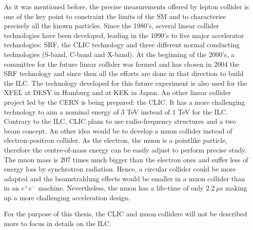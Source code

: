     As it was mentioned before, the precise measurements offered by lepton collider is one of the key point to constraint the limits of the \gls{SM} and to characterise precisely all the known particles.
    Since the 1980's, several linear collider technologies have been developed, leading in the 1990's to five major accelerator technologies: \gls{SRF}, the \gls{CLIC} technology and three different normal conducting technologies (S-band, C-band and X-band)\cite{Desy1988}.
    At the beginning of the 2000's, a committee for the future linear collider was formed and has chosen in 2004 the \gls{SRF} technology\cite{ICFA2004} and since then all the efforts are done in that direction to build the \gls{ILC}.
    The technology developed for this future experiment is also used for the XFEL at DESY in Hamburg and at KEK in Japan.
    An other linear collider project led by the CERN is being prepared: the \gls{CLIC}.
    It has a more challenging technology to aim a nominal energy of 3 TeV instead of 1 TeV for the \gls{ILC}.
    Contrary to the \gls{ILC}, \gls{CLIC} plans to use radio-frequency structures and a two beam concept. 
    An other idea would be to develop a muon collider instead of electron-positron collider\cite{Lipton2012}.
    As the electron, the muon is a pointlike particle, therefore the centre-of-mass energy can be easily adjust to perform precise study.
    The muon mass is 207 times much bigger than the electron ones and suffer less of energy loss by synchrotron radiation.
    Hence, a circular collider could be more adapted and the beamstrahlung effects would be smaller in a muon collider than in an $e^+e^-$ machine.
    Nevertheless, the muon has a life-time of only $2.2 \ \mu\text{s}$ making up a more challenging acceleration design.
    

    For the purpose of this thesis, the \gls{CLIC} and muon colliders will not be described more to focus in details on the \gls{ILC}.
     

